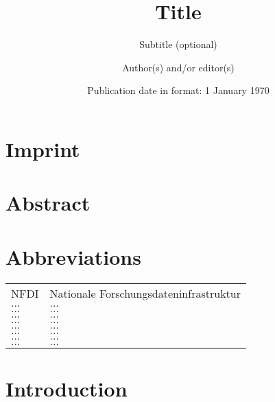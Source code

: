 \documentclass[headsepline,titlepage,twoside,12pt]{scrreprt}
\author{Author(s) and/or editor(s)}
\date{Publication date in format: 1 January 1970}
\title{Title}
\subtitle{Subtitle (optional)}
\begin{document}
\allowdisplaybreaks%


\maketitle

\chapter*{Imprint}\label{ch:introduction}

\chapter*{Abstract}\label{ch:abstract}

\chapter*{Abbreviations}
\begin{tabularx}{\textwidth}{lX}
NFDI					&Nationale Forschungsdateninfrastruktur\\
$\ldots$				&$\ldots$\\
$\ldots$				&$\ldots$\\
$\ldots$				&$\ldots$\\
$\ldots$				&$\ldots$\\
$\ldots$				&$\ldots$\\
$\ldots$				&$\ldots$\\
$\ldots$				&$\ldots$\\
$\ldots$				&$\ldots$\\
\end{tabularx}

\tableofcontents

\chapter{Introduction}\label{ch:introduction}
\end{document}
